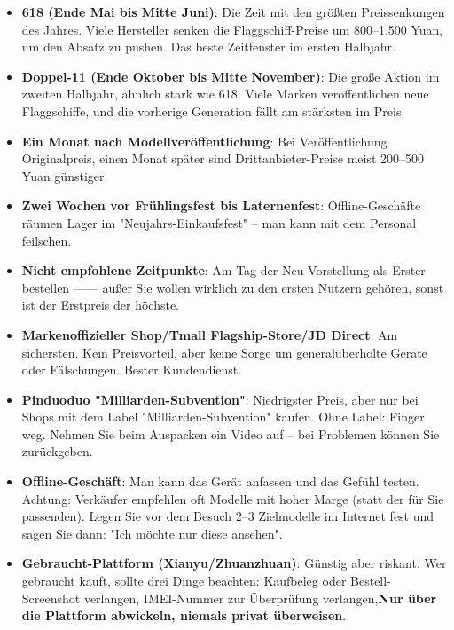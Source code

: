 \begin{itemize}
  \item \textbf{618 (Ende Mai bis Mitte Juni)}: Die Zeit mit den größten Preissenkungen des Jahres. Viele Hersteller senken die Flaggschiff-Preise um 800–1.500 Yuan, um den Absatz zu pushen. Das beste Zeitfenster im ersten Halbjahr.
  \item \textbf{Doppel-11 (Ende Oktober bis Mitte November)}: Die große Aktion im zweiten Halbjahr, ähnlich stark wie 618. Viele Marken veröffentlichen neue Flaggschiffe, und die vorherige Generation fällt am stärksten im Preis.
  \item \textbf{Ein Monat nach Modellveröffentlichung}: Bei Veröffentlichung Originalpreis, einen Monat später sind Drittanbieter-Preise meist 200–500 Yuan günstiger.
  \item \textbf{Zwei Wochen vor Frühlingsfest bis Laternenfest}: Offline-Geschäfte räumen Lager im "Neujahrs-Einkaufsfest" – man kann mit dem Personal feilschen.
  \item \textbf{Nicht empfohlene Zeitpunkte}: Am Tag der Neu-Vorstellung als Erster bestellen —— außer Sie wollen wirklich zu den ersten Nutzern gehören, sonst ist der Erstpreis der höchste.
\end{itemize}


\begin{itemize}
  \item \textbf{Markenoffizieller Shop/Tmall Flagship-Store/JD Direct}: Am sichersten. Kein Preisvorteil, aber keine Sorge um generalüberholte Geräte oder Fälschungen. Bester Kundendienst.
  \item \textbf{Pinduoduo "Milliarden-Subvention"}: Niedrigster Preis, aber nur bei Shops mit dem Label "Milliarden-Subvention" kaufen. Ohne Label: Finger weg. Nehmen Sie beim Auspacken ein Video auf – bei Problemen können Sie zurückgeben.
  \item \textbf{Offline-Geschäft}: Man kann das Gerät anfassen und das Gefühl testen. Achtung: Verkäufer empfehlen oft Modelle mit hoher Marge (statt der für Sie passenden). Legen Sie vor dem Besuch 2–3 Zielmodelle im Internet fest und sagen Sie dann: "Ich möchte nur diese ansehen".
  \item \textbf{Gebraucht-Plattform (Xianyu/Zhuanzhuan)}: Günstig aber riskant. Wer gebraucht kauft, sollte drei Dinge beachten: Kaufbeleg oder Bestell-Screenshot verlangen, IMEI-Nummer zur Überprüfung verlangen,\textbf{Nur über die Plattform abwickeln, niemals privat überweisen}.
\end{itemize}

